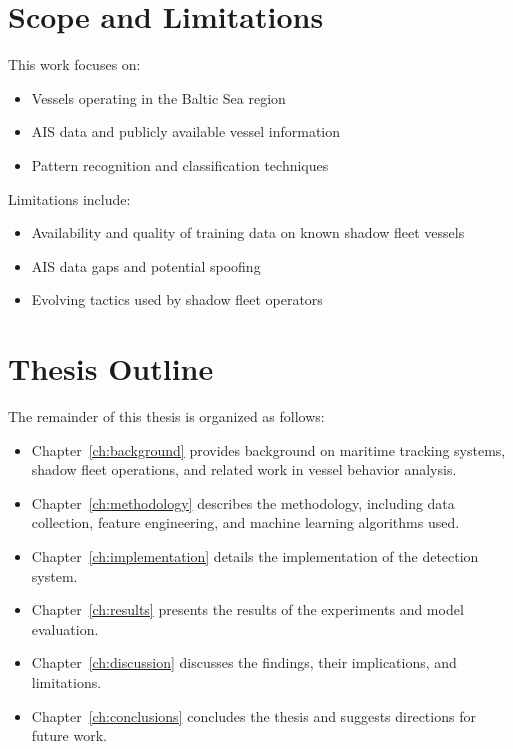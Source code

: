 \section{Scope and Limitations}
This work focuses on:
\begin{itemize}
    \item Vessels operating in the Baltic Sea region
    \item AIS data and publicly available vessel information
    \item Pattern recognition and classification techniques
\end{itemize}

Limitations include:
\begin{itemize}
    \item Availability and quality of training data on known shadow fleet vessels
    \item AIS data gaps and potential spoofing
    \item Evolving tactics used by shadow fleet operators
\end{itemize}

\section{Thesis Outline}
The remainder of this thesis is organized as follows:
\begin{itemize}
    \item Chapter~\ref{ch:background} provides background on maritime tracking systems, shadow fleet operations, and related work in vessel behavior analysis.
    \item Chapter~\ref{ch:methodology} describes the methodology, including data collection, feature engineering, and machine learning algorithms used.
    \item Chapter~\ref{ch:implementation} details the implementation of the detection system.
    \item Chapter~\ref{ch:results} presents the results of the experiments and model evaluation.
    \item Chapter~\ref{ch:discussion} discusses the findings, their implications, and limitations.
    \item Chapter~\ref{ch:conclusions} concludes the thesis and suggests directions for future work.
\end{itemize}
